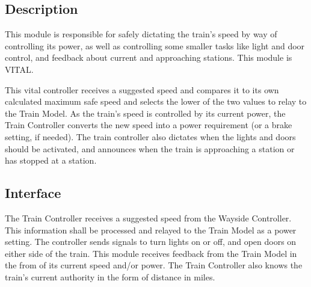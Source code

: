 \documentclass{scrreprt}
\begin{document}
\subsection{Description}
This module is responsible for safely dictating the train's speed by way of controlling its power, as well as controlling some smaller tasks like light and door control, and feedback about current and approaching stations. This module is VITAL.

This vital controller receives a suggested speed and compares it to its own calculated maximum safe speed and selects the lower of the two values to relay to the Train Model. As the train's speed is controlled by its current power, the Train Controller converts the new speed into a power requirement (or a brake setting, if needed).  The train controller also dictates when the lights and doors should be activated, and announces when the train is approaching a station or has stopped at a station.

\subsection{Interface}
The Train Controller receives a suggested speed from the Wayside Controller. This information shall be processed and relayed to the Train Model as a power setting.  The controller sends signals to turn lights on or off, and open doors on either side of the train.  This module receives feedback from the Train Model in the from of its current speed and/or power.  The Train Controller also knows the train's current authority in the form of distance in miles.
\end{document}
